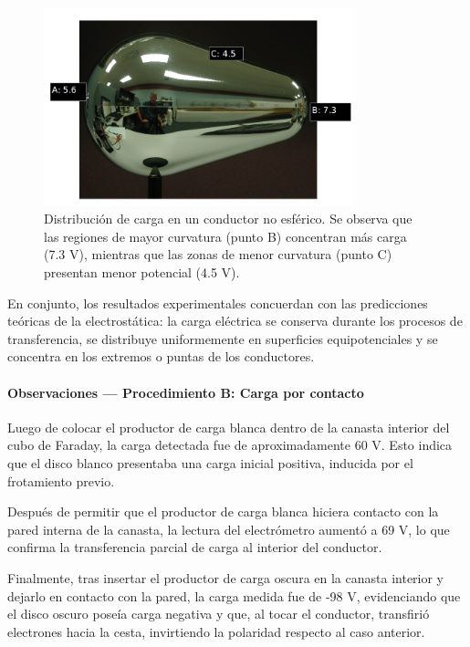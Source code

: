 \documentclass[12pt,a4paper]{article}
\begin{document}
\begin{figure}[H]
    \centering
    \includegraphics[width=0.8\textwidth]{anexos/gotaResultados.png}
    \caption{Distribución de carga en un conductor no esférico. Se observa que las regiones de mayor curvatura (punto B) concentran más carga (7.3 V), mientras que las zonas de menor curvatura (punto C) presentan menor potencial (4.5 V).}
    \label{fig:gota}
\end{figure}

En conjunto, los resultados experimentales concuerdan con las predicciones teóricas de la electrostática: la carga eléctrica se conserva durante los procesos de transferencia, se distribuye uniformemente en superficies equipotenciales y se concentra en los extremos o puntas de los conductores.

\paragraph{Observaciones --- Procedimiento B: Carga por contacto}

Luego de colocar el productor de carga blanca dentro de la canasta interior del cubo de Faraday,
la carga detectada fue de aproximadamente 60 V.
Esto indica que el disco blanco presentaba una carga inicial positiva, inducida por el frotamiento previo.

Después de permitir que el productor de carga blanca hiciera contacto con la pared interna de la canasta,
la lectura del electrómetro aumentó a 69 V, lo que confirma la transferencia parcial de carga al interior del conductor.

Finalmente, tras insertar el productor de carga oscura en la canasta interior y dejarlo en contacto con la pared,
la carga medida fue de -98 V, evidenciando que el disco oscuro poseía carga negativa y que, al tocar el conductor, transfirió electrones hacia la cesta, invirtiendo la polaridad respecto al caso anterior.
\end{document}
